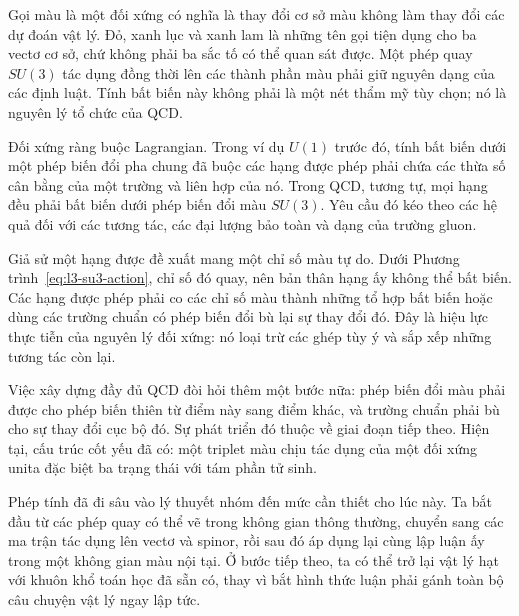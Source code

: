 Gọi màu là một đối xứng có nghĩa là thay đổi cơ sở màu không làm thay đổi các dự đoán vật lý. Đỏ, xanh lục và xanh lam là những tên gọi tiện dụng cho ba vectơ cơ sở, chứ không phải ba sắc tố có thể quan sát được. Một phép quay \(SU(3)\) tác dụng đồng thời lên các thành phần màu phải giữ nguyên dạng của các định luật. Tính bất biến này không phải là một nét thẩm mỹ tùy chọn; nó là nguyên lý tổ chức của QCD.

Đối xứng ràng buộc Lagrangian. Trong ví dụ \(U(1)\) trước đó, tính bất biến dưới một phép biến đổi pha chung đã buộc các hạng được phép phải chứa các thừa số cân bằng của một trường và liên hợp của nó. Trong QCD, tương tự, mọi hạng đều phải bất biến dưới phép biến đổi màu \(SU(3)\). Yêu cầu đó kéo theo các hệ quả đối với các tương tác, các đại lượng bảo toàn và dạng của trường gluon.

Giả sử một hạng được đề xuất mang một chỉ số màu tự do. Dưới Phương trình~\eqref{eq:l3-su3-action}, chỉ số đó quay, nên bản thân hạng ấy không thể bất biến. Các hạng được phép phải co các chỉ số màu thành những tổ hợp bất biến hoặc dùng các trường chuẩn có phép biến đổi bù lại sự thay đổi đó. Đây là hiệu lực thực tiễn của nguyên lý đối xứng: nó loại trừ các ghép tùy ý và sắp xếp những tương tác còn lại.

Việc xây dựng đầy đủ QCD đòi hỏi thêm một bước nữa: phép biến đổi màu phải được cho phép biến thiên từ điểm này sang điểm khác, và trường chuẩn phải bù cho sự thay đổi cục bộ đó. Sự phát triển đó thuộc về giai đoạn tiếp theo. Hiện tại, cấu trúc cốt yếu đã có: một triplet màu chịu tác dụng của một đối xứng unita đặc biệt ba trạng thái với tám phần tử sinh.

Phép tính đã đi sâu vào lý thuyết nhóm đến mức cần thiết cho lúc này. Ta bắt đầu từ các phép quay có thể vẽ trong không gian thông thường, chuyển sang các ma trận tác dụng lên vectơ và spinor, rồi sau đó áp dụng lại cùng lập luận ấy trong một không gian màu nội tại. Ở bước tiếp theo, ta có thể trở lại vật lý hạt với khuôn khổ toán học đã sẵn có, thay vì bắt hình thức luận phải gánh toàn bộ câu chuyện vật lý ngay lập tức.
